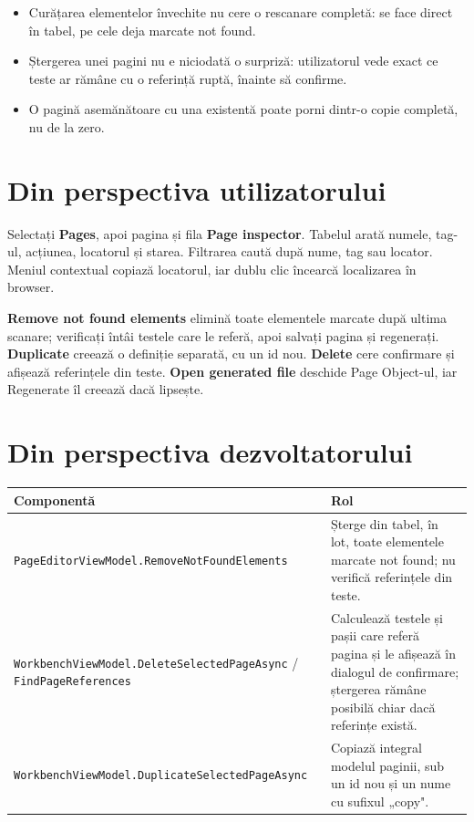 \documentclass[12pt,a4paper]{report}
\newcommand{\UI}[1]{\textbf{#1}}
\newcommand{\File}[1]{\nolinkurl{#1}}
\begin{document}
\begin{itemize}
  \item Curățarea elementelor învechite nu cere o rescanare completă: se face direct în tabel, pe cele deja marcate not found.
  \item Ștergerea unei pagini nu e niciodată o surpriză: utilizatorul vede exact ce teste ar rămâne cu o referință ruptă, înainte să confirme.
  \item O pagină asemănătoare cu una existentă poate porni dintr-o copie completă, nu de la zero.
\end{itemize}

\section{Din perspectiva utilizatorului}

Selectați \UI{Pages}, apoi pagina și fila \UI{Page inspector}. Tabelul arată numele, tag-ul, acțiunea, locatorul și starea. Filtrarea caută după nume, tag sau locator. Meniul contextual copiază locatorul, iar dublu clic încearcă localizarea în browser.

\UI{Remove not found elements} elimină toate elementele marcate după ultima scanare; verificați întâi testele care le referă, apoi salvați pagina și regenerați. \UI{Duplicate} creează o definiție separată, cu un id nou. \UI{Delete} cere confirmare și afișează referințele din teste. \UI{Open generated file} deschide Page Object-ul, iar Regenerate îl creează dacă lipsește.

\section{Din perspectiva dezvoltatorului}

\begin{tabularx}{\textwidth}{@{}p{5.3cm}Y@{}}
\toprule \textbf{Componentă} & \textbf{Rol} \\
\midrule
\File{PageEditorViewModel.RemoveNotFoundElements} & Șterge din tabel, în lot, toate elementele marcate not found; nu verifică referințele din teste. \\
\File{WorkbenchViewModel.DeleteSelectedPageAsync} / \File{FindPageReferences} & Calculează testele și pașii care referă pagina și le afișează în dialogul de confirmare; ștergerea rămâne posibilă chiar dacă referințe există. \\
\File{WorkbenchViewModel.DuplicateSelectedPageAsync} & Copiază integral modelul paginii, sub un id nou și un nume cu sufixul „copy". \\
\bottomrule
\end{tabularx}
\end{document}
